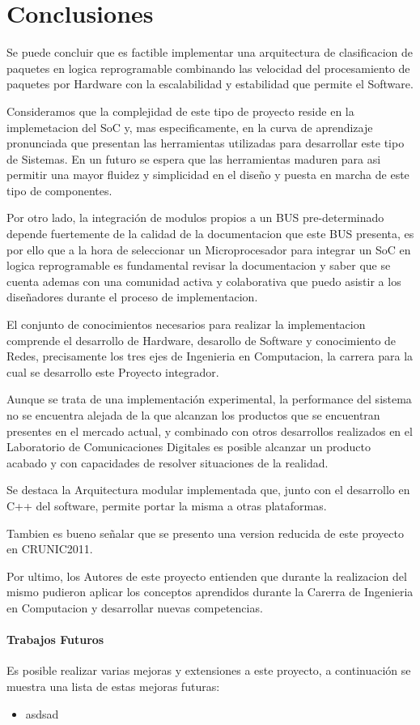 \chapter{Conclusiones}


Se puede concluir que es factible implementar una arquitectura de clasificacion de paquetes en logica reprogramable combinando las velocidad del procesamiento de paquetes por Hardware con la escalabilidad y estabilidad que permite el Software. 

Consideramos que la complejidad de este tipo de proyecto reside en la implemetacion del SoC y, mas especificamente, en la curva de aprendizaje pronunciada que presentan las herramientas utilizadas para desarrollar este tipo de Sistemas. En un futuro se espera que las herramientas maduren para asi permitir una mayor fluidez y simplicidad en el diseño y puesta en marcha de este tipo de componentes. 

Por otro lado, la integración de modulos propios a un BUS pre-determinado depende fuertemente de la calidad de la documentacion que este BUS presenta, es por ello que a la hora de seleccionar un Microprocesador para integrar un SoC en logica reprogramable es fundamental revisar la documentacion y saber que se cuenta ademas con una comunidad activa y colaborativa que puedo asistir a los diseñadores durante el proceso de implementacion. 

El conjunto de conocimientos necesarios para realizar la implementacion comprende el desarrollo de Hardware, desarollo de Software y conocimiento de Redes, precisamente los tres ejes de Ingenieria en Computacion, la carrera para la cual se desarrollo este Proyecto integrador. 

Aunque se trata de una implementación experimental, la performance del sistema no se encuentra alejada de la que alcanzan los productos que se encuentran presentes en el mercado actual, y combinado con otros desarrollos realizados en el Laboratorio de Comunicaciones Digitales es posible alcanzar un producto acabado y con capacidades de resolver situaciones de la realidad.

Se destaca la Arquitectura modular implementada que, junto con el desarrollo en C++ del software, permite portar la misma a otras plataformas.

Tambien es bueno señalar que se presento una version reducida de este proyecto en CRUNIC2011.

Por ultimo, los Autores de este proyecto entienden que durante la realizacion del mismo pudieron aplicar los conceptos aprendidos durante la Carerra de Ingenieria en Computacion y desarrollar nuevas competencias. 



\subsubsection{Trabajos Futuros}

Es posible realizar varias mejoras y extensiones a este proyecto, a continuación se muestra una lista de estas mejoras futuras:

\begin{itemize}
	\item asdsad
\end{itemize}






